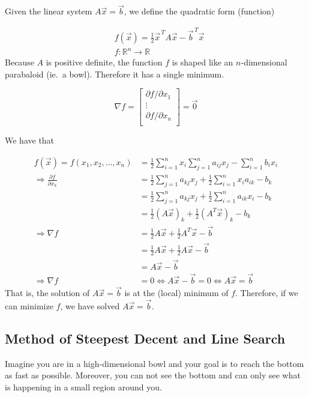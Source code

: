 Given the linear system $A\vec{x} = \vec{b}$, we define the quadratic form (function)

\begin{align*}
    &f(\vec{x}) = \frac{1}{2}\vec{x}^{\,T}A\vec{x} - \vec{b}^{\,T}\vec{x} \\
    &f: \mathbb{R}^n \rightarrow \mathbb{R}
\end{align*}
Because $A$ is positive definite, the function $f$ is shaped like an $n$-dimensional parabaloid (ie.\ a bowl). Therefore it has a single minimum.

\begin{equation*}
    \nabla f =
    \begin{bmatrix}
        \partial f / \partial x_1\\
        \vdots \\
        \partial f / \partial x_n\\
    \end{bmatrix}
    =\vec{0}
\end{equation*}

We have that

\begin{align*}
    f(\vec{x}) = f(x_1, x_2, \ldots, x_n) &= \frac{1}{2} \sum_{i=1}^{n} x_i \sum_{j=1}^{n} a_{ij} x_j - \sum_{i=1}^{n} b_i x_i \\
    \Rightarrow \frac{\partial f}{\partial x_k} &=\frac{1}{2} \sum_{j=1}^{n} a_{kj} x_j + \frac{1}{2} \sum_{i=1}^{n} x_i a_{ik} - b_k \\
    &=\frac{1}{2} \sum_{j=1}^{n} a_{kj} x_j + \frac{1}{2} \sum_{i=1}^{n} a_{ik} x_i - b_k \\
    &= \frac{1}{2} (A\vec{x})_k + \frac{1}{2} (A^T\vec{x})_k - b_k \\
    \Rightarrow \nabla f &= \frac{1}{2} A\vec{x} + \frac{1}{2} A^T\vec{x} - \vec{b} \\
    &= \frac{1}{2} A\vec{x} + \frac{1}{2} A\vec{x} - \vec{b} \\
    &= A\vec{x} - \vec{b} \\
    \Rightarrow \nabla f &= 0 \Leftrightarrow A\vec{x} - \vec{b} = 0
    \Leftrightarrow A \vec{x} = \vec{b}
\end{align*}
That is, the solution of $A \vec{x} = \vec{b}$ is at the (local) minimum of $f$. Therefore, if we can minimize $f$, we have solved $A \vec{x} = \vec{b}$.


\subsection{Method of Steepest Decent and Line Search}
Imagine you are in a high-dimensional bowl and your goal is to reach the bottom as fast as possible. Moreover, you can not see the bottom and can only see what is happening in a small region around you.

